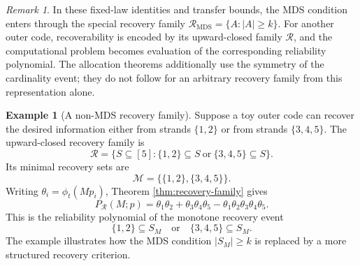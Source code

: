\documentclass[11pt]{article}
\theoremstyle{definition}
\newtheorem{example}{Example}
\theoremstyle{remark}
\newtheorem{remark}{Remark}
\newcommand{\1}{\mathbf 1}
\begin{document}
\begin{remark}
In these fixed-law identities and transfer bounds, the MDS condition enters through the special recovery family \(\mathcal R_{\mathrm{MDS}}=\{A:|A|\ge k\}\). For another outer code, recoverability is encoded by its upward-closed family \(\mathcal R\), and the computational problem becomes evaluation of the corresponding reliability polynomial. The allocation theorems additionally use the symmetry of the cardinality event; they do not follow for an arbitrary recovery family from this representation alone.
\end{remark}

\begin{example}[A non-MDS recovery family]
Suppose a toy outer code can recover the desired information either from strands \(\{1,2\}\) or from strands \(\{3,4,5\}\).  The upward-closed recovery family is
\[
  \mathcal R=\{S\subseteq[5]:\{1,2\}\subseteq S\ \text{or}\ \{3,4,5\}\subseteq S\}.
\]
Its minimal recovery sets are
\[
  \mathcal M=\bigl\{\{1,2\},\{3,4,5\}\bigr\}.
\]
Writing \(\theta_i=\phi_t(Mp_i)\), Theorem \ref{thm:recovery-family} gives
\[
  P_{\mathcal R}(M;p)
  =\theta_1\theta_2+\theta_3\theta_4\theta_5
   -\theta_1\theta_2\theta_3\theta_4\theta_5.
\]
This is the reliability polynomial of the monotone recovery event
\[
  \{1,2\}\subseteq S_M\quad\text{or}\quad \{3,4,5\}\subseteq S_M.
\]
The example illustrates how the MDS condition \(|S_M|\ge k\) is replaced by a more structured recovery criterion.
\end{example}
\end{document}
